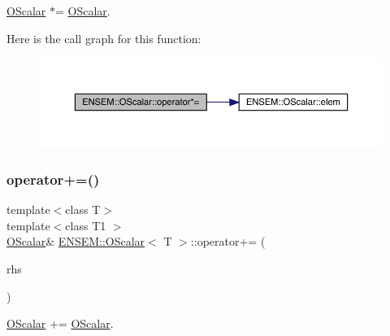 \mbox{\hyperlink{classENSEM_1_1OScalar}{O\+Scalar}} $\ast$= \mbox{\hyperlink{classENSEM_1_1OScalar}{O\+Scalar}}. 

Here is the call graph for this function\+:
\nopagebreak
\begin{figure}[H]
\begin{center}
\leavevmode
\includegraphics[width=350pt]{da/d80/classENSEM_1_1OScalar_a9977cd15ef5da689d65713ddf0768085_cgraph}
\end{center}
\end{figure}
\mbox{\label{classENSEM_1_1OScalar_a3109a05113cade86410bc77f60812023}} 
\subsubsection{\texorpdfstring{operator+=()}{operator+=()}\hspace{0.1cm}{\footnotesize\ttfamily [1/3]}}
{\footnotesize\ttfamily template$<$class T$>$ \\
template$<$class T1 $>$ \\
\mbox{\hyperlink{classENSEM_1_1OScalar}{O\+Scalar}}\& \mbox{\hyperlink{classENSEM_1_1OScalar}{E\+N\+S\+E\+M\+::\+O\+Scalar}}$<$ T $>$\+::operator+= (\begin{DoxyParamCaption}\item[{const \mbox{\hyperlink{classENSEM_1_1OScalar}{O\+Scalar}}$<$ T1 $>$ \&}]{rhs }\end{DoxyParamCaption})\hspace{0.3cm}{\ttfamily [inline]}}



\mbox{\hyperlink{classENSEM_1_1OScalar}{O\+Scalar}} += \mbox{\hyperlink{classENSEM_1_1OScalar}{O\+Scalar}}. 

